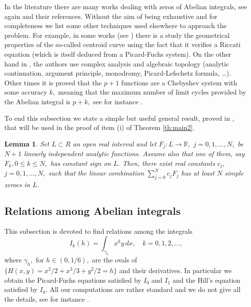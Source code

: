 \documentclass[12pt,a4paper,reqno]{amsart}
\newcommand{\R}{\mathbb{R}}
\newtheorem{lema}[teo]{Lemma}
\begin{document}
 In the literature there are many works dealing with zeros of Abelian integrals, see again
 \cite{ChrLi2007,UrbHoss2017}
 and their references. Without the aim of being exhaustive
 and for completeness we list some other techniques used elsewhere to approach the problem.
        For example, in some works (see \cite{DumFreLiCheZhaZif1997, HorIli1994, Peng2002}) there is a
         study the geometrical properties of the so-called centroid curve using the fact that it verifies a
          Riccati equation (which is itself deduced from a Picard-Fuchs system).  On the other hand in
          \cite{GasLiWeiLliZha2002, GauGavIli2009, Lubomir2001, LubomirIliya2002,Petrov1988}, the authors use complex analysis and
          algebraic topology (analytic continuation, argument principle, monodromy, Picard-Lefschetz formula,
          \ldots). Other times it is proved that the $p+1$
          functions are a Chebyshev system with some accuracy $k,$
          meaning that the maximum number of limit cycles
          provided by the Abelian integral is $p+k,$ see for
          instance \cite{GasLazTor2012}.

To end this subsection we state a simple but useful general result,
proved in \cite{ColGasPro}, that will be used in the proof of item
(i) of Theorem \ref{th:main2}.

\begin{lema}\label{le:li} Set $L\subset R$ an open real interval and let
$F_j:L\to\R,$ $j=0,1,\ldots,N,$ be $N+1$ linearly independent
analytic functions. Assume also that one of them, say $F_k, 0\le
k\le N,$  has constant sign on $L.$ Then, there exist real constants
$c_j,$ $j=0,1,\ldots,N,$ such that the linear combination
$\sum_{j=0}^N c_j F_j$ has at least $N$ simple zeroes in $L.$
\end{lema}


\subsection{Relations among Abelian integrals}\label{ss:raai}

This subsection is devoted to find relations among the integrals
\begin{equation}\label{eq:int}
I_k(h)=\int_{\gamma_h} x^k y\,dx, \quad k=0,1,2,\ldots,
\end{equation}
where $\gamma_h,$ for $h\in (0,1/6),$ are the ovals of
$\{H(x,y)=x^2/2+x^3/3+y^2/2=h\}$ and their derivatives. In
particular we obtain the Picard-Fuchs equations satisfied by $I_0$
and $I_1$ and the Hill's equation satisfied by $I_0.$ All our
computations are rather standard and we do not give all the details,
see for instance \cite{ChrLi2007}.
\end{document}
